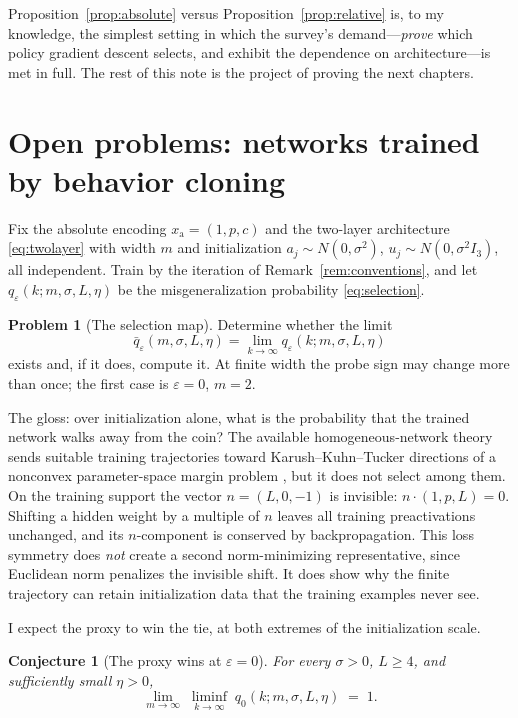 \documentclass[11pt]{amsart}
\theoremstyle{plain}
\newtheorem{conjecture}[theorem]{Conjecture}
\theoremstyle{definition}
\newtheorem{problem}[theorem]{Problem}
\begin{document}
Proposition~\ref{prop:absolute} versus Proposition~\ref{prop:relative} is, to my knowledge, the simplest setting in which the survey's demand---\emph{prove} which policy gradient descent selects, and exhibit the dependence on architecture---is met in full. The rest of this note is the project of proving the next chapters.

\section{Open problems: networks trained by behavior cloning}\label{sec:nets}

Fix the absolute encoding $x_{\mathrm a}=(1,p,c)$ and the two-layer architecture \eqref{eq:twolayer} with width $m$ and initialization $a_j\sim N(0,\sigma^2)$, $u_j\sim N(0,\sigma^2 I_3)$, all independent. Train by the iteration of Remark~\ref{rem:conventions}, and let $q_\varepsilon(k;m,\sigma,L,\eta)$ be the misgeneralization probability \eqref{eq:selection}.

\begin{problem}[The selection map]\label{prob:selectionmap}
Determine whether the limit
\[
\bar q_\varepsilon(m,\sigma,L,\eta)
   =\lim_{k\to\infty}q_\varepsilon(k;m,\sigma,L,\eta)
\]
exists and, if it does, compute it. At finite width the probe sign may change more than once; the first case is $\varepsilon=0$, $m=2$.
\end{problem}

The gloss: over initialization alone, what is the probability that the trained network walks away from the coin? The available homogeneous-network theory sends suitable training trajectories toward Karush--Kuhn--Tucker directions of a nonconvex parameter-space margin problem \cite{lyu2020,jitelgarsky2020}, but it does not select among them. On the training support the vector $n=(L,0,-1)$ is invisible: $n\cdot(1,p,L)=0$. Shifting a hidden weight by a multiple of $n$ leaves all training preactivations unchanged, and its $n$-component is conserved by backpropagation. This loss symmetry does \emph{not} create a second norm-minimizing representative, since Euclidean norm penalizes the invisible shift. It does show why the finite trajectory can retain initialization data that the training examples never see.

I expect the proxy to win the tie, at both extremes of the initialization scale.

\begin{conjecture}[The proxy wins at $\varepsilon=0$]\label{conj:proxywins}
For every $\sigma>0$, $L\ge4$, and sufficiently small $\eta>0$,
\[
   \lim_{m\to\infty}\;\liminf_{k\to\infty}\;q_0(k;m,\sigma,L,\eta)\;=\;1 .
\]
\end{conjecture}
\end{document}
